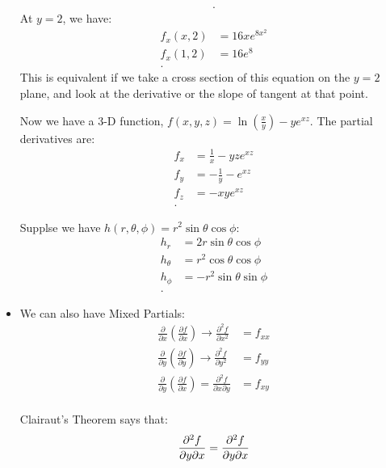 \begin{itemize}
\begin{example}
\begin{align*}
			.\end{align*}
			At $y=2$, we have:
			\begin{align*}
				f_x\left( x,2 \right)  &= 16xe^{8x^2}\\
				f_x\left( 1,2 \right)  &= 16e^{8} \\
			.\end{align*}
			This is equivalent if we take a cross section of this equation on the $y=2$ plane, and look at the derivative or the slope of tangent at that point.
		\end{example}
		\begin{example}
			Now we have a 3-D function, $f\left( x, y,z \right)  = \ln\left( \frac{x}{y} \right) -ye^{xz}$. The partial derivatives are:
			\begin{align*}
				f_x &= \frac{1}{x} - yze^{xz}\\
				f_y &= -\frac{1}{y} - e^{xz} \\
				f_z &=  -xye^{xz} \\
			.\end{align*}
		\end{example}
		\begin{example}
			Supplse we have $h\left( r,\theta,\phi \right) =r^2 \sin\theta \cos\phi$:
			\begin{align*}
				h_r &=  2r\sin\theta \cos \phi \\
				h_\theta &= r^2\cos\theta\cos\phi\\
				h_\phi &= -r^2\sin\theta\sin\phi \\
			.\end{align*}
		\end{example}
	\item We can also have Mixed Partials:
		\begin{align*}
		\frac{\partial }{\partial x} \left( \frac{\partial f}{\partial x}  \right) \to \frac{\partial ^2f}{\partial x^2} &= f_{x x} \\
		\frac{\partial }{\partial y} \left( \frac{\partial f}{\partial y}  \right)  \to \frac{\partial ^2f}{\partial y^2}  &= f_{y y} \\
		\frac{\partial }{\partial y} \left( \frac{\partial f}{\partial x}  \right)  = \frac{\partial ^2f}{\partial x \partial y}  &=  f_{xy}\\ 
	\end{align*}
		\begin{theorem}
			Clairaut's Theorem says that:
			\begin{equation}
				\frac{\partial ^2f}{\partial y \partial x}  = \frac{\partial ^2f}{\partial y \partial x} \\

\end{equation}
\end{theorem}
\end{itemize}
